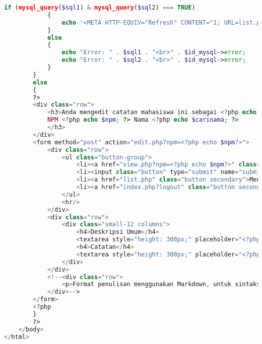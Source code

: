 \begin{lstlisting}[language=php,basicstyle=\tiny,caption=edit.php]
			if (mysql_query($sql1) & mysql_query($sql2) === TRUE) 
			{
				echo '<META HTTP-EQUIV="Refresh" CONTENT="1; URL=list.php">';
			} 
			else
			{
				echo "Error: " . $sql1 . "<br>" . $id_mysql->error;
				echo "Error: " . $sql2 . "<br>" . $id_mysql->error;
			}
		}
		else
		{
		?>
		<div class="row">
			<h3>Anda mengedit catatan mahasiswa ini sebagai <?php echo $_SESSION['email']?>.<br/>
			NPM <?php echo $npm; ?> Nama <?php echo $carinama; ?>
			</h3>
		</div>
		<form method="post" action="edit.php?npm=<?php echo $npm?>">
			<div class="row">
				<ul class="button-group">
					<li><a href="view.php?npm=<?php echo $npm?>" class="button secondary">Kembali</a></li>
					<li><input class="button" type="submit" name="submit" value="Simpan"></li>
					<li><a href="list.php" class="button secondary">Menu Utama</a></li>
					<li><a href="index.php?logout" class="button secondary">Logout</a></li>
				</ul>
				<hr/>
			</div>
			<div class="row">
				<div class="small-12 columns">
					<h4>Deskripsi Umum</h4>
					<textarea style="height: 300px;" placeholder="<?php echo $cariketerangan; ?>" name="keteranganbaru"><?php echo $cariketerangan; ?></textarea>
					<h4>Catatan</h4>
					<textarea style="height: 300px;" placeholder="<?php echo $caricatatan; ?>" name="catatanbaru"><?php echo $caricatatan; ?></textarea>
				</div>
			</div>
			<!--<div class="row">
				<p>Format penulisan menggunakan Markdown, untuk sintaks Markdown dapat dilihat <a href='https://help.github.com/articles/github-flavored-markdown/' target="_blank">disini</a>.</p>
			</div>-->
		</form>
		<?php
		}
		?>
	</body>
</html>
\end{lstlisting}

